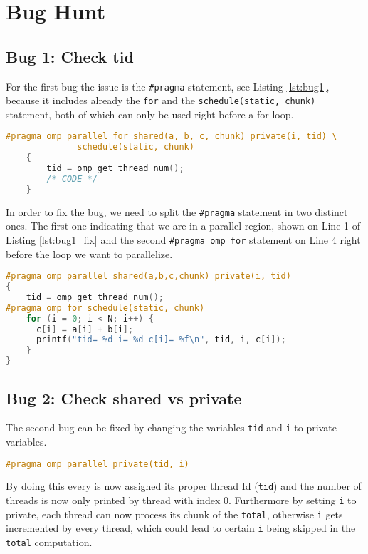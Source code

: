 \section{Bug Hunt}

\subsection{Bug 1: Check tid}
For the first bug the issue is the \texttt{\#pragma} statement, see Listing \ref{lst:bug1}, because it includes already the \texttt{for} and the \texttt{schedule(static, chunk)} statement, both of which can only be used right before a for-loop.
\begin{lstlisting}[language=C++, caption=Bug in bug1.c, label=lst:bug1]
#pragma omp parallel for shared(a, b, c, chunk) private(i, tid) \
              schedule(static, chunk)
	{
		tid = omp_get_thread_num();
		/* CODE */
	}
\end{lstlisting}
In order to fix the bug, we need to split the \texttt{\#pragma} statement in two distinct ones. The first one indicating that we are in a parallel region, shown on Line 1 of Listing \ref{lst:bug1_fix} and the second \texttt{\#pragma omp for} statement on Line 4 right before the loop we want to parallelize.
\begin{lstlisting}[language=C++, caption=Fix for bug1.c, label=lst:bug1_fix]
#pragma omp parallel shared(a,b,c,chunk) private(i, tid)
{
    tid = omp_get_thread_num();
#pragma omp for schedule(static, chunk) 
    for (i = 0; i < N; i++) {
      c[i] = a[i] + b[i];
      printf("tid= %d i= %d c[i]= %f\n", tid, i, c[i]);
    }
}
\end{lstlisting}

\subsection{Bug 2: Check shared vs private}
The second bug can be fixed by changing the variables \texttt{tid} and \texttt{i} to private variables.
\begin{lstlisting}[language=C++, caption=Fix bug2.c, label=lst:bug2_fix]
#pragma omp parallel private(tid, i)
\end{lstlisting}
By doing this every is now assigned its proper thread Id (\texttt{tid}) and the number of threads is now only printed by thread with index 0. Furthermore by setting \texttt{i} to private, each thread can now process its chunk of the \texttt{total}, otherwise \texttt{i} gets incremented by every thread, which could lead to certain \texttt{i} being skipped in the \texttt{total} computation.

